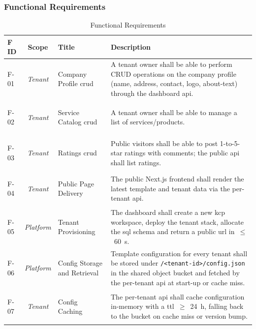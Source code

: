 \documentclass[11pt, a4paper, oneside, listof=totoc]{scrartcl}
\begin{document}
            \subsubsection{Functional Requirements}\label{subsubsec:fr}
                \begin{table}[H]\label{tab:fr}
                    \centering{}
                    \renewcommand{\arraystretch}{1.5}
                    \begin{tabular}{lcp{4cm}P{8cm}}
                        \toprule
                        F ID & Scope & Title & Description \\
                        \midrule
                        \hypertarget{f1}{F-01} & \textit{Tenant} & Company Profile \gls{crud} & A tenant owner shall be able to perform CRUD operations on the company profile (name, address, contact, logo, about-text) through the dashboard \gls{api}. \\
                        \hypertarget{f2}{F-02} & \textit{Tenant} & Service Catalog \gls{crud} & A tenant owner shall be able to manage a list of services/products. \\
                        \hypertarget{f3}{F-03} & \textit{Tenant} & Ratings \gls{crud} & Public visitors shall be able to post 1-to-5-star ratings with comments; the public \gls{api} shall list ratings. \\
                        \hypertarget{f4}{F-04} & \textit{Tenant} & Public Page Delivery & The public Next.js frontend shall render the latest template and tenant data via the per-tenant \gls{api}. \\
                        \hypertarget{f5}{F-05} & \textit{Platform} & Tenant Provisioning & The dashboard shall create a new \gls{kcp} workspace, deploy the tenant stack, allocate the \gls{sql} schema and return a public \gls{url} in~$\leq$~60~s. \\
                        \hypertarget{f6}{F-06} & \textit{Platform} & Config Storage and Retrieval & Template configuration for every tenant shall be stored under \texttt{/<tenant-id>/config.json} in the shared object bucket and fetched by the per-tenant \gls{api} at start-up or cache miss. \\
                        \hypertarget{f7}{F-07} & \textit{Tenant} & Config Caching & The per-tenant \gls{api} shall cache configuration in-memory with a \gls{ttl}~$\geq$~24~h, falling back to the bucket on cache miss or version bump. \\
                        \bottomrule
                    \end{tabular}
                    \caption{Functional Requirements}
                \end{table}
\end{document}
